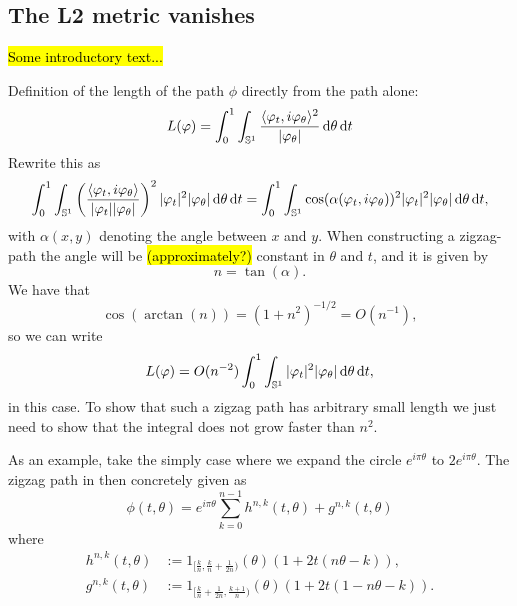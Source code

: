 \subsection*{The L2 metric vanishes}
\label{sec:l2-metric-vanishes}

\hl{Some introductory text...}

Definition of the length of the path $\phi$ directly from the path alone:
\begin{equation*}
  L(\varphi) = \int_{0}^{1} \int_{\mathbb{S}^{1}}
  \frac{\langle\varphi_{t},i \varphi_{\theta}\rangle^2}{|\varphi_{\theta}|}  \mathop{}\!\mathrm{d} \theta \mathop{}\!\mathrm{d} t
\end{equation*}
Rewrite this as
\begin{equation*}
  \int_{0}^{1} \int_{\mathbb{S}^{1}}
  \left(
    \frac{\langle\varphi_{t},i
      \varphi_{\theta}\rangle}{|\varphi_{t}||\varphi_{\theta}|}
  \right)^2
  |\varphi_t|^2   |\varphi_{\theta}|
  \mathop{}\!\mathrm{d} \theta \mathop{}\!\mathrm{d} t
  =
  \int_{0}^{1} \int_{\mathbb{S}^{1}}
  \cos(\alpha(\varphi_t, i\varphi_{\theta}))^2
  |\varphi_t|^2   |\varphi_{\theta}|
  \mathop{}\!\mathrm{d} \theta \mathop{}\!\mathrm{d} t,
\end{equation*}
with $\alpha(x,y)$ denoting the angle between $x$ and $y$. When
constructing a zigzag-path the angle will be \hl{(approximately?)}
constant in $\theta$ and $t$,
and it is given by
\begin{equation*}
  n = \tan(\alpha).
\end{equation*}
We have that
\begin{equation*}
  \cos(\arctan(n)) = (1+n^2)^{-1/2}
  = O(n^{-1}),
\end{equation*}
so we can write
\begin{equation*}
  L(\varphi) = O(n^{-2})
  \int_{0}^{1} \int_{\mathbb{S}^{1}}
  |\varphi_t|^2   |\varphi_{\theta}|
  \mathop{}\!\mathrm{d} \theta \mathop{}\!\mathrm{d} t,
\end{equation*}
in this case. To show that such a zigzag path has arbitrary
small length we just need to show that the integral does not grow
faster than $n^2$.

As an example, take the simply case where we expand the circle $e^{i\pi\theta}$ to
$2e^{i\pi\theta}$. The zigzag path in then concretely given as
\begin{equation*}
  \phi(t,\theta) = e^{i\pi\theta}
    \sum_{k=0}^{n-1}
    h^{n,k}(t,\theta) + g^{n,k}(t,\theta)
\end{equation*}
where
\begin{equation*}
  \begin{aligned}
    h^{n,k}(t,\theta) & := 1_{[\frac{k}{n},\frac{k}{n} +
      \frac{1}{2n})}(\theta) \left( 1+2t(n\theta-k) \right), \\
    g^{n,k}(t,\theta) & := 1_{[\frac{k}{n} + \frac{1}{2n},\frac{k+1}{n})}(\theta)
    \left( 1+2t(1-n\theta-k) \right).
  \end{aligned}
\end{equation*}

